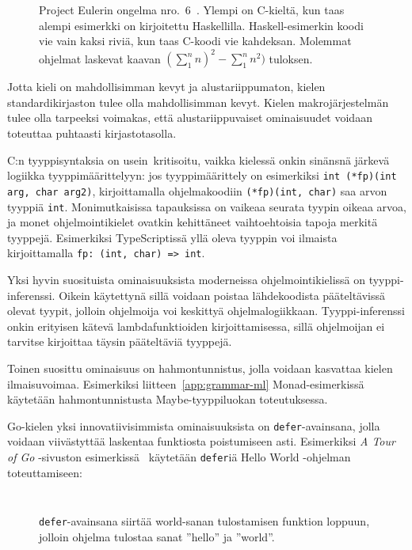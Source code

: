 \begin{figure}[ht!]
    \inputminted{C}{squaresum.c}
    \inputminted{Haskell}{squaresum.hs}
    \caption{Project Eulerin ongelma nro.\ 6~\citep{euler}. Ylempi on
    C-kieltä, kun taas alempi esimerkki on kirjoitettu Haskellilla.
    Haskell-esimerkin koodi vie vain kaksi riviä, kun taas C-koodi vie
    kahdeksan. Molemmat ohjelmat laskevat kaavan
    $(\sum\limits_1^n n)^2 - \sum\limits_1^n n^2)$ tuloksen.
    }
    \label{fig:strcmp}
\end{figure}

\FloatBarrier

Jotta kieli on mahdollisimman kevyt ja alustariippumaton, kielen
standardikirjaston tulee olla mahdollisimman kevyt. Kielen makrojärjestelmän
tulee olla tarpeeksi voimakas, että alustariippuvaiset ominaisuudet voidaan
toteuttaa puhtaasti kirjastotasolla.

C:n tyyppisyntaksia on usein\citationneeded~kritisoitu, vaikka kielessä onkin
sinänsnä järkevä logiikka tyyppimäärittelyyn: jos tyyppimäärittely on esimerkiksi
\texttt{int (*fp)(int arg, char arg2)}, kirjoittamalla ohjelmakoodiin
\texttt{(*fp)(int, char)} saa arvon tyyppiä \texttt{int}. Monimutkaisissa
tapauksissa on vaikeaa seurata tyypin oikeaa arvoa, ja monet ohjelmointikielet
ovatkin kehittäneet vaihtoehtoisia tapoja merkitä tyyppejä. Esimerkiksi
TypeScriptissä yllä oleva tyyppin voi ilmaista kirjoittamalla \texttt{fp: (int,
char) => int}.

Yksi hyvin suosituista ominaisuuksista moderneissa ohjelmointikielissä on
tyyppi-inferenssi. Oikein käytettynä sillä voidaan poistaa lähdekoodista
pääteltävissä olevat tyypit, jolloin ohjelmoija voi keskittyä ohjelmalogiikkaan.
Tyyppi-inferenssi onkin erityisen kätevä lambdafunktioiden kirjoittamisessa,
sillä ohjelmoijan ei tarvitse kirjoittaa täysin pääteltäviä tyyppejä.

Toinen suosittu ominaisuus on hahmontunnistus, jolla
voidaan kasvattaa kielen ilmaisuvoimaa. Esimerkiksi
liitteen~\ref{app:grammar-ml} Monad-esimerkissä käytetään hahmontunnistusta
Maybe-tyyppiluokan toteutuksessa.

Go-kielen yksi innovatiivisimmista ominaisuuksista on \texttt{defer}-avainsana,
jolla voidaan viivästyttää laskentaa funktiosta poistumiseen asti. Esimerkiksi
\emph{A Tour of Go} -sivuston esimerkissä~\citep{gotourdefer} käytetään
\texttt{defer}iä Hello World -ohjelman toteuttamiseen:

\begin{figure}[ht!]
    \inputminted{Go}{defer.go}
    \inputminted{text}{defer-output}
    \caption{\texttt{defer}-avainsana siirtää world-sanan tulostamisen funktion
    loppuun, jolloin ohjelma tulostaa sanat ''hello'' ja ''world''.}
\end{figure}

